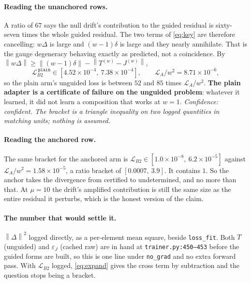 \documentclass[11pt]{article}
\newcommand{\eps}{\varepsilon}
\newcommand{\norm}[1]{\left\lVert #1 \right\rVert}
\theoremstyle{plain}
\theoremstyle{remark}
\begin{document}
\paragraph{Reading the unanchored rows.}
A ratio of $67$ says the null drift's contribution to the guided residual is sixty-seven times the
whole guided residual. The two terms of \eqref{eq:key} are therefore cancelling: $w\Delta$ is large
and $(w-1)\delta$ is large and they nearly annihilate. That is the gauge degeneracy behaving exactly
as predicted, not a coincidence. By $\norm{w\Delta} \ge \norm{(w-1)\delta} - \norm{T^{(w)}-J^{(w)}}$,
\begin{equation}
  \mathcal{L}_{B2}^{\ \texttt{plain}} \in [4.52\times10^{-4},\ 7.38\times10^{-4}],
  \qquad
  \mathcal{L}_A/w^2 = 8.71\times10^{-6},
  \label{eq:plainbracket}
\end{equation}
so the plain arm's unguided loss is between $52$ and $85$ times $\mathcal{L}_A/w^2$. \textbf{The
plain adapter is a certificate of failure on the unguided problem}: whatever it learned, it did not
learn a composition that works at $w=1$. \emph{Confidence: confident. The bracket is a triangle
inequality on two logged quantities in matching units; nothing is assumed.}

\paragraph{Reading the anchored row.}
The same bracket for the anchored arm is $\mathcal{L}_{B2} \in [1.0\times10^{-8},\
6.2\times10^{-5}]$ against $\mathcal{L}_A/w^2 = 1.58\times10^{-5}$, a ratio bracket of
$[0.0007,\ 3.9]$. It contains $1$. So the anchor takes the divergence from certified to
undetermined, and no more than that. At $\mu = 10$ the drift's amplified contribution is still the
same size as the entire residual it perturbs, which is the honest version of the claim.

\paragraph{The number that would settle it.}
$\norm{\Delta}^2$ logged directly, as a per-element mean square, beside \texttt{loss\_fit}. Both
$T$ (unguided) and $\eps_J$ (cached raw) are in hand at \texttt{trainer.py:450--453} before the
guided forms are built, so this is one line under \texttt{no\_grad} and no extra forward pass. With
$\mathcal{L}_{B2}$ logged, \eqref{eq:expand} gives the cross term by subtraction and the question
stops being a bracket.
\end{document}
